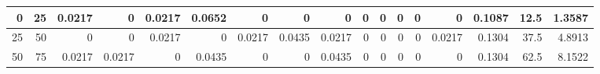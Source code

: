 \begin{table}[ht]
\begin{adjustbox}{width = \textwidth, center}
\begin{tabular}{|rr|r|r|r|r|r|r|r|r|r|r|r|r|r|r|r|}
            \cellcolor[HTML]{D9EAD3}0              & \cellcolor[HTML]{C8E4BE}25             & \cellcolor[HTML]{C7E9D8}0.0217                 & 0                                              & \cellcolor[HTML]{C7E9D8}0.0217                 & \cellcolor[HTML]{57BB8A}0.0652                 & 0                                              & 0                                              & 0                                              & 0                                               & 0                                               & 0                                               & 0                                               & 0                                               & \cellcolor[HTML]{D9D2E9}0.1087                                                  & \cellcolor[HTML]{D9D2E9}12.5                                            & \cellcolor[HTML]{D9D2E9}1.3587                                                        \\ \hline
            \cellcolor[HTML]{D9EAD3}25             & \cellcolor[HTML]{C8E4BE}50             & \cellcolor[HTML]{FFFFFF}0                      & \cellcolor[HTML]{FFFFFF}0                      & \cellcolor[HTML]{C7E9D8}0.0217                 & \cellcolor[HTML]{FFFFFF}0                      & \cellcolor[HTML]{C7E9D8}0.0217                 & \cellcolor[HTML]{8FD2B1}0.0435                 & \cellcolor[HTML]{C7E9D8}0.0217                 & \cellcolor[HTML]{FFFFFF}0                       & \cellcolor[HTML]{FFFFFF}0                       & \cellcolor[HTML]{FFFFFF}0                       & \cellcolor[HTML]{FFFFFF}0                       & \cellcolor[HTML]{C7E9D8}0.0217                  & \cellcolor[HTML]{D9D2E9}0.1304                                                  & \cellcolor[HTML]{D9D2E9}37.5                                            & \cellcolor[HTML]{D9D2E9}4.8913                                                        \\ \hline
            \cellcolor[HTML]{D9EAD3}50             & \cellcolor[HTML]{C8E4BE}75             & \cellcolor[HTML]{C7E9D8}0.0217                 & \cellcolor[HTML]{C7E9D8}0.0217                 & \cellcolor[HTML]{FFFFFF}0                      & \cellcolor[HTML]{8FD2B1}0.0435                 & \cellcolor[HTML]{FFFFFF}0                      & \cellcolor[HTML]{FFFFFF}0                      & \cellcolor[HTML]{8FD2B1}0.0435                 & \cellcolor[HTML]{FFFFFF}0                       & \cellcolor[HTML]{FFFFFF}0                       & \cellcolor[HTML]{FFFFFF}0                       & \cellcolor[HTML]{FFFFFF}0                       & \cellcolor[HTML]{FFFFFF}0                       & \cellcolor[HTML]{D9D2E9}0.1304                                                  & \cellcolor[HTML]{D9D2E9}62.5                                            & \cellcolor[HTML]{D9D2E9}8.1522                                                        \\ \hline

\end{tabular}
\end{adjustbox}
\end{table}
